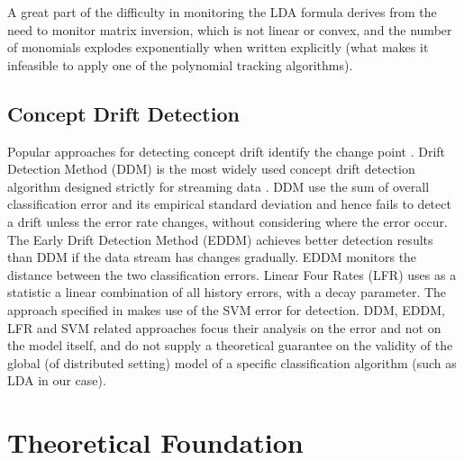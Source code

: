 \documentclass{sig-alternate-05-2015}
\begin{document}
A great part of the difficulty in monitoring the LDA formula derives from the
need to monitor matrix inversion, which is not linear or convex,
and the number of monomials explodes exponentially when written explicitly
(what makes it infeasible to apply one of the polynomial tracking
algorithms).
\subsection{Concept Drift Detection}

Popular approaches for detecting concept drift identify the change point
\cite{gama2004learning,wang2013concept}. Drift Detection Method (DDM) is the
most widely used concept drift detection algorithm designed strictly for streaming data 
\cite{gama2004learning}. DDM use the sum of overall classification error and 
its empirical standard deviation and hence fails to detect a drift unless the
error rate changes, without considering where the error occur.
The Early Drift Detection Method (EDDM) \cite{baena2006early} achieves better
detection results than DDM if the data stream has changes gradually.
EDDM monitors the distance between the two classification errors. 
Linear Four Rates (LFR) \cite{wang2015concept} uses as a statistic a linear
combination of all history errors, with a decay parameter. The approach 
specified in \cite{klinkenberg2000detecting,dries2009adaptive} makes use of
the SVM error for detection. DDM, EDDM, LFR and SVM related approaches focus
their analysis on the error and not on the model itself, and do not supply a
theoretical guarantee on the validity of the global (of distributed setting) 
model of a specific classification algorithm (such as LDA in our case).

 
\section{Theoretical Foundation}
\end{document}
